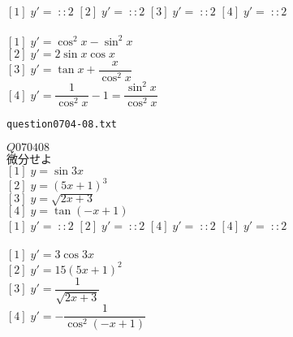 \documentclass[10pt,dvipdfmx]{jarticle}
\begin{document}
$[1]\;y'=\;::2$ 
$[2]\;y'=\;::2$ 
$[3]\;y'=\;::2$ 
$[4]\;y'=\;::2$ 
\\
\\
$[1]\;y'=\cos^{2}\! x -\sin^{2}\! x $\\
$[2]\;y'=2\sin x \cos x $\\
$[3]\;y'=\tan x +\dfrac{x}{\cos^{2}\! x }$\\
$[4]\;y'=\dfrac{1}{\cos^{2}\! x }-1=\dfrac{\sin^{2}\! x }{\cos^{2}\! x }$\\
\newpage
\begin{center}
\verb|question0704-08.txt|\\
\end{center}
$Q070408$\\
$\text{微分せよ}$\\
$[1]\;y=\sin 3x $\\
$[2]\;y=(5x+1)^3$\\
$[3]\;y=\sqrt{2x+3}$\\
$[4]\;y=\tan (-x+1) $\\
$[1]\;y'=\;::2$ 
$[2]\;y'=\;::2$ 
$[4]\;y'=\;::2$ 
$[4]\;y'=\;::2$ 
\\
\\
$[1]\;y'=3\cos 3x $\\
$[2]\;y'=15(5x+1)^2$\\
$[3]\;y'=\dfrac{1}{\sqrt{2x+3}}$\\
$[4]\;y'=-\dfrac{1}{\cos^{2}\! (-x+1) }$\\
\newpage
\end{document}
